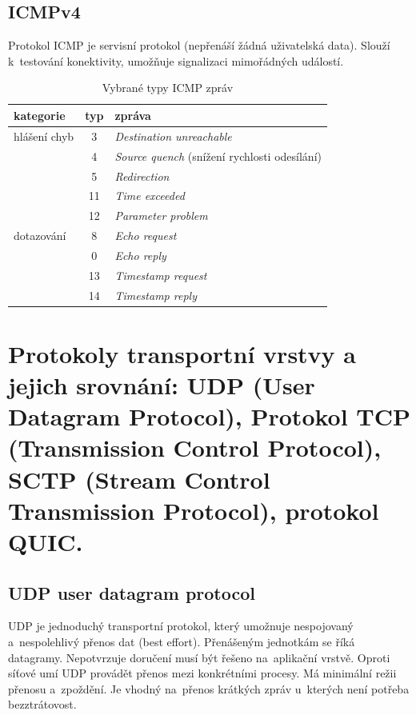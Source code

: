 \subsection{ICMPv4}

Protokol ICMP je servisní protokol (nepřenáší žádná uživatelská data). Slouží k~testování konektivity, umožňuje signalizaci mimořádných událostí.

\begin{table}[ht]
	\centering
	\caption{Vybrané typy ICMP zpráv}
	\begin{tabular}{|l|c|l|}
		\hline
		kategorie    & typ & zpráva \\\hline\hline
		hlášení chyb & 3   & \emph{Destination unreachable} \\
		             & 4   & \emph{Source quench} (snížení rychlosti odesílání) \\
		             & 5   & \emph{Redirection} \\
		             & 11  & \emph{Time exceeded} \\
		             & 12  & \emph{Parameter problem} \\
		\hline
		dotazování   & 8   & \emph{Echo request} \\
		             & 0   & \emph{Echo reply} \\
		             & 13  & \emph{Timestamp request} \\
		             & 14  & \emph{Timestamp reply} \\
		\hline
	\end{tabular}
\end{table}



\clearpage
\section{Protokoly transportní vrstvy a jejich srovnání: UDP (User Datagram Protocol), Protokol TCP (Transmission Control Protocol), SCTP (Stream Control Transmission Protocol), protokol QUIC.}

\subsection{UDP user datagram protocol}

UDP je jednoduchý transportní protokol, který umožnuje nespojovaný a~nespolehlivý přenos dat (best effort). Přenášeným jednotkám se říká datagramy. Nepotvrzuje doručení musí být řešeno na~aplikační vrstvě. Oproti síťové umí UDP provádět přenos mezi konkrétními procesy. Má minimální režii přenosu a~zpoždění. Je vhodný na~přenos krátkých zpráv u~kterých není potřeba bezztrátovost.

